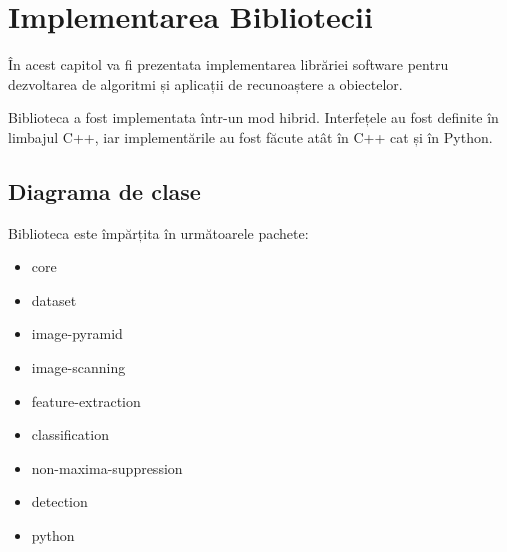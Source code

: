 \chapter{Implementarea Bibliotecii}

În acest capitol va fi prezentata implementarea librăriei software pentru dezvoltarea de algoritmi și aplicații de recunoaștere a obiectelor.

Biblioteca a fost implementata într-un mod hibrid.
Interfețele au fost definite în limbajul C++, iar implementările au fost făcute atât în C++ cat și în Python.


\section{Diagrama de clase}

Biblioteca este împărțita în următoarele pachete:
\begin{itemize}
	\item core
	\item dataset
	\item image-pyramid
	\item image-scanning
	\item feature-extraction
	\item classification
	\item non-maxima-suppression
	\item detection
	\item python
\end{itemize}

